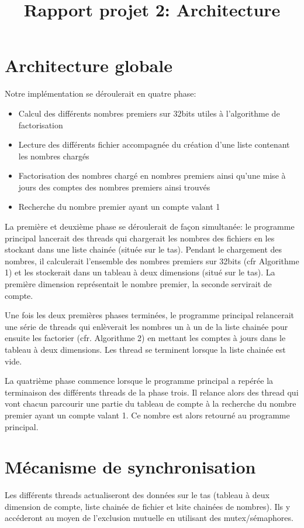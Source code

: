 \documentclass[11pt,a4paper]{article}
\begin{document}
\title{Rapport projet 2: Architecture}
\maketitle

\section*{Architecture globale}
Notre implémentation se déroulerait en quatre phase:

\begin{itemize}
\item{Calcul des différents nombres premiers sur 32bits utiles à l'algorithme de factorisation}
\item{Lecture des différents fichier accompagnée du création d'une liste contenant les nombres chargés}
\item{Factorisation des nombres chargé en nombres premiers ainsi qu'une mise à jours des comptes des nombres premiers ainsi trouvés}
\item{Recherche du nombre premier ayant un compte valant 1}
\end{itemize}

La première et deuxième phase se déroulerait de façon simultanée: le programme principal lancerait des threads qui chargerait les nombres des fichiers en les stockant dans une liste chainée (située sur le tas). Pendant le chargement des nombres, il calculerait l'ensemble des nombres premiers sur 32bits (cfr Algorithme 1) et les stockerait dans un tableau à deux dimensions (situé sur le tas). La première dimension représentait le nombre premier, la seconde servirait de compte. 

Une fois les deux premières phases terminées, le programme principal relancerait une série de threads qui enlèverait les nombres un à un de la liste chainée pour ensuite les factorier (cfr. Algorithme 2) en mettant les comptes à jours dans le tableau à deux dimensions. Les thread se terminent lorsque la liste chainée est vide. 

La quatrième phase commence lorsque le programme principal a repérée la terminaison des différents threads de la phase trois. Il relance alors des thread qui vont chacun parcourir une partie du tableau de compte à la recherche du nombre premier ayant un compte valant 1. Ce nombre est alors retourné au programme principal. 

\section*{Mécanisme de synchronisation}
Les différents threads actualiseront des données sur le tas (tableau à deux dimension de compte, liste chainée de fichier et lsite chainées de nombres). Ils y accéderont au moyen de l'exclusion mutuelle en utilisant des mutex/sémaphores.
\end{document}
